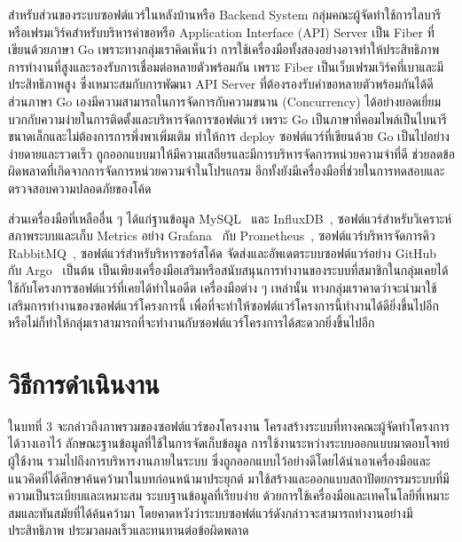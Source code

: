 \documentclass[12pt,one side,openright,a4paper]{cpe-thesis-th}
\newcommand{\thaijustify}[1]{%
  \par\hspace{30pt}\justifying
  #1
}
\begin{document}
\thaijustify{
  สำหรับส่วนของระบบซอฟต์แวร์ในหลังบ้านหรือ Backend System กลุ่มคณะผู้จัดทำใช้การไลบารีหรือเฟรมเวิร์คสำหรับบริหารคำขอหรือ Application Interface (API) Server เป็น Fiber ที่เขียนด้วยภาษา Go เพราะทางกลุ่มเราคิดเห็นว่า การใช้เครื่องมือทั้งสองอย่างอาจทำให้ประสิทธิภาพการทำงานที่สูงและรองรับการเชื่อมต่อหลายตัวพร้อมกัน เพราะ Fiber เป็นเว็บเฟรมเวิร์คที่เบาและมีประสิทธิภาพสูง ซึ่งเหมาะสมกับการพัฒนา API Server ที่ต้องรองรับคำขอหลายตัวพร้อมกันได้ดี~\cite{gofiber, malomo20fiber} ส่วนภาษา Go เองมีความสามารถในการจัดการกับความขนาน (Concurrency) ได้อย่างยอดเยี่ยม บวกกับความง่ายในการติดตั้งและบริหารจัดการซอฟต์แวร์ เพราะ Go เป็นภาษาที่คอมไพล์เป็นไบนารีขนาดเล็กและไม่ต้องการการพึ่งพาเพิ่มเติม ทำให้การ deploy ซอฟต์แวร์ที่เขียนด้วย Go เป็นไปอย่างง่ายดายและรวดเร็ว ถูกออกแบบมาให้มีความเสถียรและมีการบริหารจัดการหน่วยความจำที่ดี ช่วยลดข้อผิดพลาดที่เกิดจากการจัดการหน่วยความจำในโปรแกรม อีกทั้งยังมีเครื่องมือที่ช่วยในการทดสอบและตรวจสอบความปลอดภัยของโค้ด~\cite{pike12go, donovan15go, pike12godev, golangorg}
}
\thaijustify{
  ส่วนเครื่องมือที่เหลืออื่น ๆ ได้แก่ฐานข้อมูล MySQL~\cite{mysql, mysqlcomm} และ InfluxDB~\cite{influxdb, influxdb-platforms, sandholm17influx}, ซอฟต์แวร์สำหรับวิเคราะห์สภาพระบบและเก็บ Metrics อย่าง Grafana~\cite{grafana, grafanaoss, sunil21grafana} กับ Prometheus~\cite{prometheus}, ซอฟต์แวร์บริหารจัดการคิว RabbitMQ~\cite{rabbitmq, roy17rabbitmq, hanwell17rabbitmq}, ซอฟต์แวร์สำหรับริหารซอร์สโค้ด จัดส่งและอัพเดตระบบซอฟต์แวร์อย่าง GitHub~\cite{github, githubprice,chacon14} กับ Argo~\cite{argodoc, argodocsync} เป็นต้น เป็นเพียงเครื่องมือเสริมหรือสนับสนุนการทำงานของระบบที่สมาชิกในกลุ่มเคยได้ใช้กับโครงการซอฟต์แวร์ที่เคยได้ทำในอดีต เครื่องมือต่าง ๆ เหล่านั้น ทางกลุ่มเราคาดว่าจะนำมาใช้เสริมการทำงานของซอฟต์แวร์โครงการนี้ เพื่อที่จะทำให้ซอฟต์แวร์โครงการนี้ทำงานได้ดียิ่งขึ้นไปอีกหรือไม่ก็ทำให้กลุ่มเราสามารถที่จะทำงานกับซอฟต์แวร์โครงการได้สะดวกยิ่งขึ้นไปอีก
}
\pagebreak
\chapter{วิธีการดำเนินงาน}

\thaijustify{
  ในบทที่ 3 จะกล่าวถึงภาพรวมของซอฟต์แวร์ของโครงงาน โครงสร้างระบบที่ทางคณะผู้จัดทำโครงการได้วางเอาไว้ ลักษณะฐานข้อมูลที่ใช้ในการจัดเก็บข้อมูล การใช้งานระหว่างระบบออกแบบมาตอบโจทย์ผู้ใช้งาน รวมไปถึงการบริหารงานภายในระบบ ซึ่งถูกออกแบบไว้อย่างดีโดยได้นำเอาเครื่องมือและแนวคิดที่ได้ศึกษาค้นคว้ามาในบทก่อนหน้ามาประยุกต์ มาใช้สร้างและออกแบบสถาปัตยกรรมระบบที่มีความเป็นระเบียบและเหมาะสม ระบบฐานข้อมูลที่เรียบง่าย ด้วยการใช้เครื่องมือและเทคโนโลยีที่เหมาะสมและทันสมัยที่ได้ค้นคว้ามา โดยคาดหวังว่าระบบซอฟต์แวร์ดังกล่าวจะสามารถทำงานอย่างมีประสิทธิภาพ ประมวลผลเร็วและทนทานต่อข้อผิดพลาด
}
\end{document}
